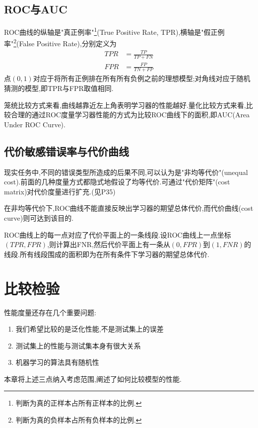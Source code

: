 \subsection{ROC与AUC}

ROC曲线的纵轴是"真正例率"\footnote{判断为真的正样本占所有正样本的比例.}(True Positive Rate, TPR),横轴是"假正例率"\footnote{判断为真的负样本占所有负样本的比例.}(False Positive Rate),分别定义为
\begin{equation}\begin{split}
TPR&=\frac{TP}{TP+FN}\\
FPR&=\frac{FP}{TN+FP}
\end{split}\end{equation}
点$(0,1)$对应于将所有正例排在所有所有负例之前的理想模型;对角线对应于随机猜测的模型,即TPR与FPR取值相同.

笼统比较方式来看,曲线越靠近左上角表明学习器的性能越好.量化比较方式来看,比较合理的通过ROC度量学习器性能的方式为比较ROC曲线下的面积,即AUC(Area Under ROC Curve).

\subsection{代价敏感错误率与代价曲线}

现实任务中,不同的错误类型所造成的后果不同,可以认为是"非均等代价"(unequal cost).前面的几种度量方式都隐式地假设了均等代价.可通过"代价矩阵"(cost matrix)对代价度量进行扩充.(见P35)

在非均等代价下,ROC曲线不能直接反映出学习器的期望总体代价,而代价曲线(cost curve)则可达到该目的.

ROC曲线上的每一点对应了代价平面上的一条线段.设ROC曲线上一点坐标$(TPR,FPR)$,则计算出FNR,然后代价平面上有一条从$(0,FPR)$到$(1,FNR)$的线段.所有线段围成的面积即为在所有条件下学习器的期望总体代价.

\section{比较检验}

性能度量还存在几个重要问题:
\begin{enumerate}
\item 我们希望比较的是泛化性能,不是测试集上的误差
\item 测试集上的性能与测试集本身有很大关系
\item 机器学习的算法具有随机性
\end{enumerate}
本章将上述三点纳入考虑范围,阐述了如何比较模型的性能.


